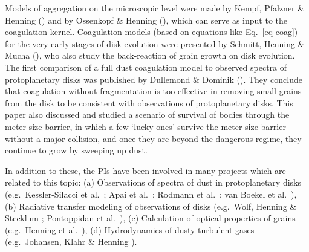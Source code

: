 Models of aggregation on the microscopic level were made by Kempf, Pfalzner
\& Henning () and by Ossenkopf \& Henning (), which can
serve as input to the coagulation kernel. Coagulation models (based on
equations like Eq.~\ref{eq-coag}) for the very early stages of disk
evolution were presented by Schmitt, Henning \& Mucha (), who also
study the back-reaction of grain growth on disk evolution. The first
comparison of a full dust coagulation model to observed spectra of
protoplanetary disks was published by Dullemond \& Dominik ().
They conclude that coagulation without fragmentation is too effective in
removing small grains from the disk to be consistent with observations of
protoplanetary disks. This paper also discussed and studied a scenario of
survival of bodies through the meter-size barrier, in which a few
`lucky ones' survive the meter size barrier without a major collision,
and once they are beyond the dangerous regime, they continue to grow
by sweeping up dust.

In addition to these, the PIs have been involved in many projects which are
related to this topic: (a) Observations of spectra of dust in protoplanetary
disks (e.g.~Kessler-Silacci et al.~; Apai et al.~;
Rodmann et al.~; van Boekel et al.~), (b) Radiative
transfer modeling of observations of disks (e.g.~Wolf, Henning \& Stecklum
; Pontoppidan et al.~), (c) Calculation of optical
properties of grains (e.g.~Henning et al.~), (d) Hydrodynamics of
dusty turbulent gases (e.g.~Johansen, Klahr \& Henning ).



